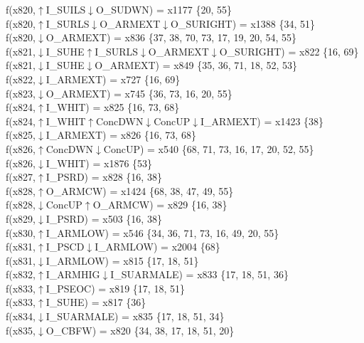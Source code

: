 f(x820,$\uparrow$I\_SUILS$\downarrow$O\_SUDWN) = x1177 \{20, 55\} \\  
f(x820,$\uparrow$I\_SURLS$\downarrow$O\_ARMEXT$\downarrow$O\_SURIGHT) = x1388 \{34, 51\} \\  
f(x820,$\downarrow$O\_ARMEXT) = x836 \{37, 38, 70, 73, 17, 19, 20, 54, 55\} \\  
f(x821,$\downarrow$I\_SUHE$\uparrow$I\_SURLS$\downarrow$O\_ARMEXT$\downarrow$O\_SURIGHT) = x822 \{16, 69\} \\  
f(x821,$\downarrow$I\_SUHE$\downarrow$O\_ARMEXT) = x849 \{35, 36, 71, 18, 52, 53\} \\  
f(x822,$\downarrow$I\_ARMEXT) = x727 \{16, 69\} \\  
f(x823,$\downarrow$O\_ARMEXT) = x745 \{36, 73, 16, 20, 55\} \\  
f(x824,$\uparrow$I\_WHIT) = x825 \{16, 73, 68\} \\  
f(x824,$\uparrow$I\_WHIT$\uparrow$ConcDWN$\downarrow$ConcUP$\downarrow$I\_ARMEXT) = x1423 \{38\} \\  
f(x825,$\downarrow$I\_ARMEXT) = x826 \{16, 73, 68\} \\  
f(x826,$\uparrow$ConcDWN$\downarrow$ConcUP) = x540 \{68, 71, 73, 16, 17, 20, 52, 55\} \\  
f(x826,$\downarrow$I\_WHIT) = x1876 \{53\} \\  
f(x827,$\uparrow$I\_PSRD) = x828 \{16, 38\} \\  
f(x828,$\uparrow$O\_ARMCW) = x1424 \{68, 38, 47, 49, 55\} \\  
f(x828,$\downarrow$ConcUP$\uparrow$O\_ARMCW) = x829 \{16, 38\} \\  
f(x829,$\downarrow$I\_PSRD) = x503 \{16, 38\} \\  
f(x830,$\uparrow$I\_ARMLOW) = x546 \{34, 36, 71, 73, 16, 49, 20, 55\} \\  
f(x831,$\uparrow$I\_PSCD$\downarrow$I\_ARMLOW) = x2004 \{68\} \\  
f(x831,$\downarrow$I\_ARMLOW) = x815 \{17, 18, 51\} \\  
f(x832,$\uparrow$I\_ARMHIG$\downarrow$I\_SUARMALE) = x833 \{17, 18, 51, 36\} \\  
f(x833,$\uparrow$I\_PSEOC) = x819 \{17, 18, 51\} \\  
f(x833,$\uparrow$I\_SUHE) = x817 \{36\} \\  
f(x834,$\downarrow$I\_SUARMALE) = x835 \{17, 18, 51, 34\} \\  
f(x835,$\downarrow$O\_CBFW) = x820 \{34, 38, 17, 18, 51, 20\} \\  
